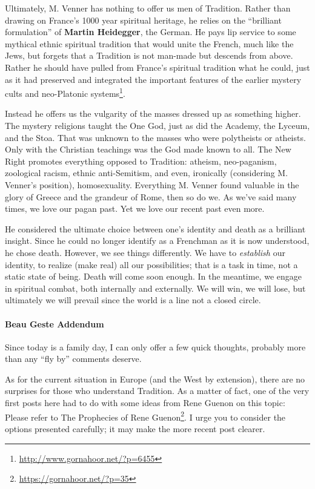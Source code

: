 Ultimately, M. Venner has nothing to offer us men of Tradition. Rather than drawing on France's 1000 year spiritual heritage, he relies on the ``brilliant formulation'' of \textbf{Martin Heidegger}, the German. He pays lip service to some mythical ethnic spiritual tradition that would unite the French, much like the Jews, but forgets that a Tradition is not man-made but descends from above. Rather he should have pulled from France's spiritual tradition what he could, just as it had preserved and integrated the important features of the earlier mystery cults and neo-Platonic systems\footnote{\url{http://www.gornahoor.net/?p=6455}}.

Instead he offers us the vulgarity of the masses dressed up as something higher. The mystery religions taught the One God, just as did the Academy, the Lyceum, and the Stoa. That was unknown to the masses who were polytheists or atheists. Only with the Christian teachings was the God made known to all. The New Right promotes everything opposed to Tradition: atheism, neo-paganism, zoological racism, ethnic anti-Semitism, and even, ironically (considering M. Venner's position), homosexuality. Everything M. Venner found valuable in the glory of Greece and the grandeur of Rome, then so do we. As we've said many times, we love our pagan past. Yet we love our recent past even more.

He considered the ultimate choice between one's identity and death as a brilliant insight. Since he could no longer identify as a Frenchman as it is now understood, he chose death. However, we see things differently. We have to \emph{establish} our identity, to realize (make real) all our possibilities; that is a task in time, not a static state of being. Death will come soon enough. In the meantime, we engage in spiritual combat, both internally and externally. We will win, we will lose, but ultimately we will prevail since the world is a line not a closed circle.

\paragraph{Beau Geste Addendum}

Since today is a family day, I can only offer a few quick thoughts, probably more than any ``fly by'' comments deserve.

As for the current situation in Europe (and the West by extension), there are no surprises for those who understand Tradition. As a matter of fact, one of the very first posts here had to do with some ideas from Rene Guenon on this topic: Please refer to The Prophecies of Rene Guenon\footnote{\url{https://gornahoor.net/?p=35}}. I urge you to consider the options presented carefully; it may make the more recent post clearer.


